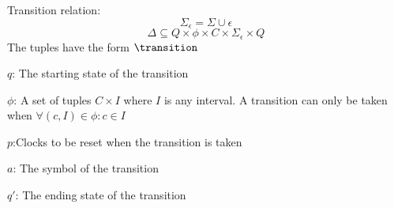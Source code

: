 
\begin{definition}\label{definition:transition}
    \cite*{Eugene2001}
    Transition relation:
    $$\Sigma_\epsilon=\Sigma\cup{\epsilon}$$
    $$\Delta\subseteq Q\times\phi\times C\times\Sigma_\epsilon\times Q$$
The tuples have the form $\transition$

$q$: The starting state of the transition

$\phi$: A set of tuples $C\times I$ where $I$ is any interval.
A transition can only be taken when $\forall (c,I)\in\phi: c\in I$

$p$:Clocks to be reset when the transition is taken

$a$: The symbol of the transition

$q'$: The ending state of the transition
\end{definition}